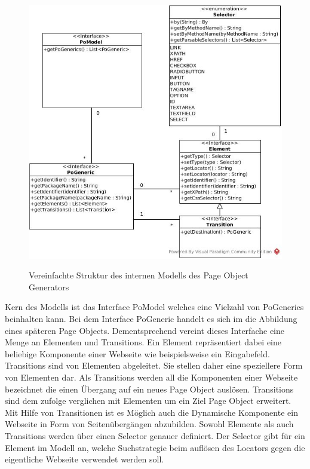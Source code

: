 \begin{figure}[htb]
  \centering  
  \includegraphics[scale=0.46]{img/SimpleModel.jpg}\\
  \caption{Vereinfachte Struktur des internen Modells des Page Object Generators}
  \label{fig:simple_model}
\end{figure}

Kern des Modells ist das Interface PoModel welches eine Vielzahl von PoGenerics beinhalten kann. Bei dem Interface PoGeneric handelt es sich im die Abbildung eines späteren Page Objects. Dementsprechend vereint dieses Interfache eine Menge an Elementen und Transitions.
Ein Element repräsentiert dabei eine beliebige Komponente einer Webseite wie beispielsweise ein Eingabefeld.
Transitions sind von Elementen abgeleitet. Sie stellen daher eine speziellere Form von Elementen dar. Als Transitions werden all die Komponenten einer Webseite bezeichnet die einen Übergang auf ein neues Page Object auslösen. Transitions sind dem zufolge verglichen mit Elementen um ein Ziel Page Object erweitert.
Mit Hilfe von Transitionen ist es Möglich auch die Dynamische Komponente ein Webseite in Form von Seitenübergängen abzubilden.
Sowohl Elemente als auch Transitions werden über einen Selector genauer definiert.
Der Selector gibt für ein Element im Modell an, welche Suchstrategie beim auflösen des Locators gegen die eigentliche Webseite verwendet werden soll.


